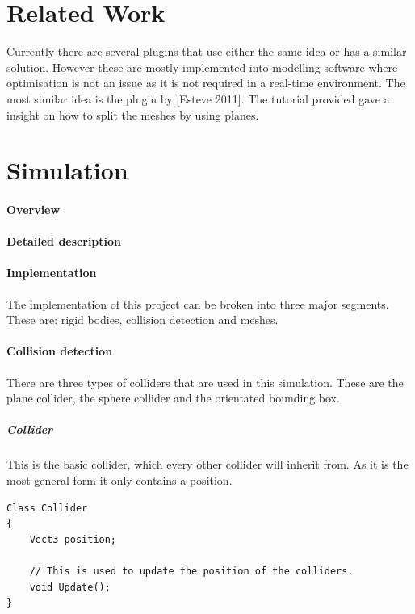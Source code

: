 \documentclass[conference,backref=page]{acmsiggraph}
\begin{document}
\section{Related Work}

Currently there are several plugins that use either the same idea or
has a similar solution. However these are mostly implemented into
modelling software where optimisation is not an issue as it is not
required in a real-time environment. The most similar idea is the
plugin by [Esteve 2011]. The tutorial provided gave a insight on how to split the meshes by using planes.

\section{Simulation}

\paragraph{Overview}


\paragraph{Detailed description}

\paragraph{Implementation}

The implementation of this project can be broken into three major segments. These are: rigid bodies, collision detection and meshes. 

\paragraph {Collision detection} \hfill

There are three types of colliders that are used in this simulation. These are the plane collider, the sphere collider and the orientated bounding box.


\subparagraph{Collider} \hfill

This is the basic collider, which every other collider will inherit from. As it is the most general form it only contains a position.

\begin{lstlisting}
Class Collider
{
	Vect3 position;
	
	// This is used to update the position of the colliders.
	void Update(); 
}
\end{lstlisting}
\end{document}

